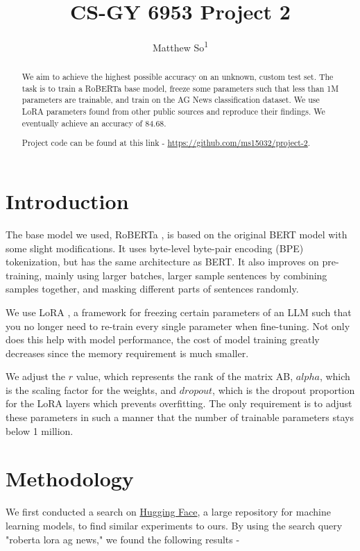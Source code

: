 \documentclass[letterpaper]{article} %
\title{CS-GY 6953 Project 2}
\author{Matthew So\textsuperscript{\rm 1}}
\begin{document}
\maketitle

\begin{abstract}
We aim to achieve the highest possible accuracy on an unknown, custom test set.  The task is to train a RoBERTa base model, freeze some parameters such that less than 1M parameters are trainable, and train on the AG News classification dataset.  We use LoRA parameters found from other public sources and reproduce their findings.  We eventually achieve an accuracy of 84.68.

Project code can be found at this link - \url{https://github.com/ms15032/project-2}.
\end{abstract}

\section{Introduction}

The base model we used, RoBERTa \cite{liu2019robertarobustlyoptimizedbert}, is based on the original BERT model with some slight modifications.  It uses byte-level byte-pair encoding (BPE) tokenization, but has the same architecture as BERT.  It also improves on pre-training, mainly using larger batches, larger sample sentences by combining samples together, and masking different parts of sentences randomly.

We use LoRA \cite{hu2021loralowrankadaptationlarge}, a framework for freezing certain parameters of an LLM such that you no longer need to re-train every single parameter when fine-tuning.  Not only does this help with model performance, the cost of model training greatly decreases since the memory requirement is much smaller.

We adjust the $r$ value, which represents the rank of the matrix AB, $alpha$, which is the scaling factor for the weights, and $dropout$, which is the dropout proportion for the LoRA layers which prevents overfitting.  The only requirement is to adjust these parameters in such a manner that the number of trainable parameters stays below 1 million.

\section{Methodology}

We first conducted a search on \href{https://huggingface.co/}{Hugging Face}, a large repository for machine learning models, to find similar experiments to ours.  By using the search query "roberta lora ag news," we found the following results -
\end{document}
